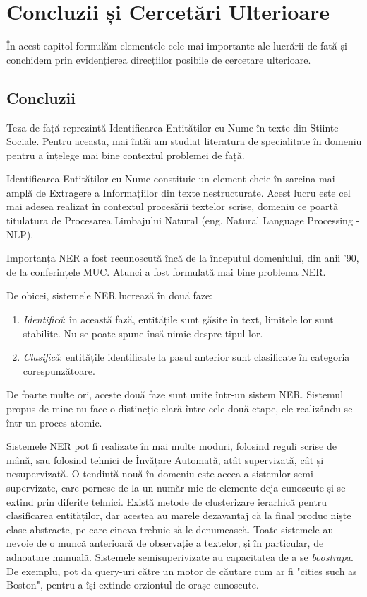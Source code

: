 \chapter{Concluzii și Cercetări Ulterioare}
\label{chapter:conclusions}

În acest capitol formulăm elementele cele mai importante ale lucrării de fată și conchidem prin evidențierea direcțiilor posibile de cercetare ulterioare.

\section{Concluzii}

Teza de față reprezintă Identificarea Entităților cu Nume în texte din Științe Sociale. Pentru aceasta, mai întăi am studiat literatura de specialitate în domeniu pentru a înțelege mai bine contextul problemei de față.


Identificarea Entităților cu Nume constituie un element cheie în sarcina mai amplă de Extragere a Informațiilor din texte nestructurate. Acest lucru este cel mai adesea realizat în contextul procesării textelor scrise, domeniu ce poartă titulatura de Procesarea Limbajului Natural (eng. Natural Language Processing - NLP).

Importanța NER a fost recunoscută încă de la începutul domeniului, din anii '90, de la conferințele MUC. Atunci a fost formulată mai bine problema NER.

De obicei, sistemele NER lucrează în două faze:

\begin{enumerate}

\item \textit{Identifică}: în această fază, entitățile sunt găsite în text, limitele lor sunt stabilite. Nu se poate spune însă nimic despre tipul lor.
\item \textit{Clasifică}: entitățile identificate la pasul anterior sunt clasificate în categoria corespunzătoare.

\end{enumerate}

De foarte multe ori, aceste două faze sunt unite într-un sistem NER. Sistemul propus de mine nu face o distincție clară între cele două etape, ele realizându-se într-un proces atomic.

Sistemele NER pot fi realizate în mai multe moduri, folosind reguli scrise de mână, sau folosind tehnici de Învățare Automată, atât supervizată, cât și nesupervizată. O tendință nouă în domeniu este aceea a sistemlor semi-supervizate, care pornesc de la un număr mic de elemente deja cunoscute și se extind prin diferite tehnici. Există metode de clusterizare ierarhică pentru clasificarea entităților, dar acestea au marele dezavantaj că la final produc niște clase abstracte, pe care cineva trebuie să le denumească. Toate sistemele au nevoie de o muncă anterioară de observație a textelor, și în particular, de adnoatare manuală. Sistemele semisuperivizate au capacitatea de a se \textit{boostrapa}. De exemplu, pot da query-uri către un motor de căutare cum ar fi "cities such as Boston", pentru a își extinde orziontul de orașe cunoscute.

